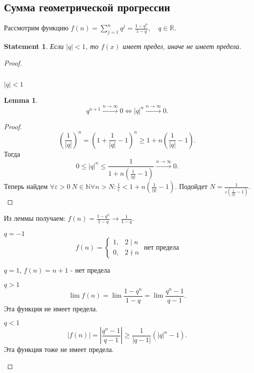 \documentclass[11pt]{book}
\newcommand{\N}{\mathbb{N}}
\newcommand{\R}{\mathbb{R}}
\renewcommand{\le}{\leqslant}
\renewcommand{\ge}{\geqslant}
\theoremstyle{definition}
\theoremstyle{plain}
\theoremstyle{plain}
\newtheorem*{lm}{Lemma}
\newtheorem*{st}{Statement}
\theoremstyle{definition}
\theoremstyle{remark}
\begin{document}
\subsection{Сумма геометрической прогрессии}\label{ques_24}
Рассмотрим функцию $f(n) = \sum\limits_{j=1}^n q^j = \frac{1-q^n}{1-q}, \quad q \in \R$.
\begin{st}
    Если $|q| < 1$, то $f(x)$ имеет предел, иначе не имеет предела.
\end{st}
\begin{proof}
    \begin{enumerate}$ $
        \item $|q| < 1$ \\
	    {\begin{lm}
	    \[
		q^{n+1} \stackrel{n \to  \infty } \longrightarrow 0 \Longleftrightarrow |q|^n\stackrel{n \to  \infty } \longrightarrow 0 
	   .\] 
	    \end{lm}
	    \begin{proof}
		\[
		    \left (\frac{1}{|q|} \right)^n = \left(1 + \frac{1}{|q|} -1\right)^n \ge 1 +n \left(\frac{1}{|q|}-1\right)
		.\]
		Тогда \[
		    0 \le |q|^n \le \frac{1}{1+n \left(\frac{1}{|q|} -1 \right)} \stackrel{n \to  \infty } \longrightarrow 0
		.\]  
		Теперь найдем $\forall \varepsilon>0 ~N \in \N \forall n > N: \frac{1}{\varepsilon } < 1 + n \left(\frac{1}{|q|} -1 \right)$. Подойдет $N = \frac{1}{\varepsilon \left(\frac{1}{|q|}-1 \right)}$. \\
	    \end{proof}
	    Из леммы получаем:
	    $f(n) = \frac{1-q^n}{1-q} \longrightarrow \frac{1}{1-q}$. 
	\item $q=- 1$  \[
		f(n) = \left \{ 
		    \begin{array}{ll}
			1 ,& 2 \mid n \\
			0  ,& 2 \nmid n
		    \end{array}
		    \right . \mbox{ нет предела}
	    \]  }
    \item $q = 1$,  $f(n) = n+1$ - нет предела
    \item $q > 1$ \\
	\[
	    \lim f(n) = \lim \frac{1 - q^n}{1 - q} = \lim \frac{q^n-1}{q-1} 
	.\] 
	Эта функция не имеет предела.
    \item $q < 1$ \\
	\[
	    |f(n) | = \left|   \frac{q^n-1}{q-1}\right| \ge  \frac{1}{|q-1|}(|q|^n -1)
	.\] 
	Эта функция тоже не имеет предела.
    \end{enumerate}
\end{proof}
\end{document}
